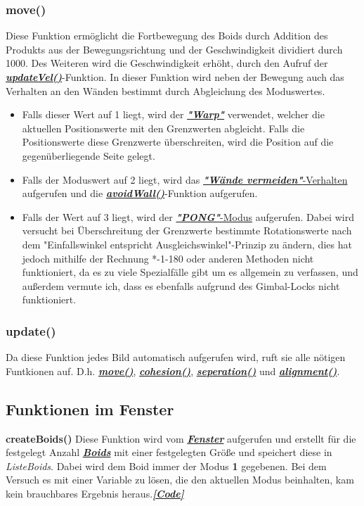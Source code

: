 \documentclass[a4paper, hidelinks, 12pt]{article}
\begin{document}
\normalsize\subsubsection{move()}\label{sec:move}
Diese Funktion ermöglicht die Fortbewegung des Boids durch Addition des Produkts aus der Bewegungsrichtung und der Geschwindigkeit dividiert durch 1000. Des Weiteren wird die Geschwindigkeit erhöht, durch den Aufruf der \hyperref[sec:updateVel]{\textbf{\emph{updateVel()}}}-Funktion.
In dieser Funktion wird neben der Bewegung auch das Verhalten an den Wänden bestimmt durch Abgleichung des Moduswertes.\newline
\begin{itemize}
\item Falls dieser Wert auf 1 liegt, wird der \hyperref[sec:Warp]{\textbf{\emph{"Warp"}}} verwendet, welcher die aktuellen Positionswerte mit den Grenzwerten abgleicht. Falls die Positionswerte diese Grenzwerte überschreiten, wird die Position auf die gegenüberliegende Seite gelegt.
\item Falls der Moduswert auf 2 liegt, wird das \hyperref[sec:AvoidWall]{\textbf{\emph{"Wände vermeiden"}}-Verhalten} aufgerufen und die \hyperref[sec:avoidWall]{\textbf{\emph{avoidWall()}}}-Funktion aufgerufen.
\item Falls der Wert auf 3 liegt, wird der \hyperref[sec:Pong]{\textbf{\emph{"PONG"}}-Modus} aufgerufen. Dabei wird versucht bei Überschreitung der Grenzwerte bestimmte Rotationswerte nach dem "Einfallswinkel entspricht Ausgleichswinkel"-Prinzip zu ändern, dies hat jedoch mithilfe der Rechnung *-1-180 oder anderen Methoden\cite{Space2022} nicht funktioniert, da es zu viele Spezialfälle gibt um es allgemein zu verfassen, und außerdem vermute ich, dass es ebenfalls aufgrund des Gimbal-Locks\cite{2022o} nicht funktioniert.
\end{itemize}
		
\subsubsection{update()}\label{sec:update}
Da diese Funktion jedes Bild automatisch aufgerufen wird\cite{update}, ruft sie alle nötigen Funtkionen auf. D.h. \hyperref[sec:move]{\textbf{\emph{move()}}}, \hyperref[sec:cohesion]{\textbf{\emph{cohesion()}}}, \hyperref[sec:seperation]{\textbf{\emph{seperation()}}} und \hyperref[sec:alignment]{\textbf{\emph{alignment()}}}.
			
\subsection{Funktionen im Fenster}
\textbf{createBoids()}\label{sec:createBoids}
Diese Funktion wird vom \hyperref[sec:Fenster]{\textbf{\emph{Fenster}}} aufgerufen und erstellt für die festgelegt Anzahl \hyperref[sec:Boid]{\textbf{\emph{Boids}}} mit einer festgelegten Größe und speichert diese in \emph{Liste\textunderscore Boids}. Dabei wird dem Boid immer der Modus \textbf{1} gegebenen. Bei dem Versuch es mit einer Variable zu lösen, die den aktuellen Modus beinhalten, kam kein brauchbares Ergebnis heraus.\hyperref[CodecreateBoids]{\textbf{\emph{[Code]}}}
			
\end{document}
